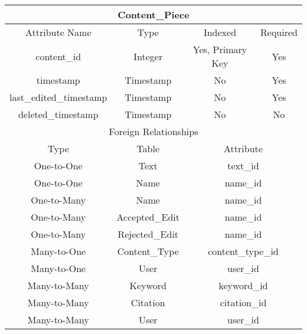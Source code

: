 \documentclass[12pt,letterpaper]{article}
\begin{document}
\begin{center}
\label{ContentPiece}
\begin{tabular}{|c|c|c|c|}
\hline
\multicolumn{4}{|c|}{Content\_Piece} \\ \hline
\multicolumn{1}{|c|}{Attribute Name} & \multicolumn{1}{c|}{Type} & \multicolumn{1}{c|}{Indexed} & \multicolumn{1}{c|}{Required} \\ \hline
content\_id & Integer & Yes, Primary Key & Yes \\ \hline
timestamp & Timestamp & No & Yes \\ \hline
last\_edited\_timestamp & Timestamp & No & Yes \\ \hline
deleted\_timestamp & Timestamp & No & No \\ \hline
\multicolumn{4}{|c|}{Foreign Relationships} \\ \hline
Type & Table & \multicolumn{2}{c|}{Attribute} \\ \hline
One-to-One & Text & \multicolumn{2}{c|}{text\_id} \\ \hline %
One-to-One & Name & \multicolumn{2}{c|}{name\_id} \\ \hline	%
One-to-Many & Name & \multicolumn{2}{c|}{name\_id} \\ \hline %
One-to-Many & Accepted\_Edit & \multicolumn{2}{c|}{name\_id} \\ \hline %
One-to-Many & Rejected\_Edit & \multicolumn{2}{c|}{name\_id} \\ \hline %
Many-to-One & Content\_Type & \multicolumn{2}{c|}{content\_type\_id} \\ \hline %
Many-to-One & User & \multicolumn{2}{c|}{user\_id} \\ \hline %
Many-to-Many & Keyword & \multicolumn{2}{c|}{keyword\_id} \\ \hline	%
Many-to-Many & Citation & \multicolumn{2}{c|}{citation\_id} \\ \hline %
Many-to-Many & User & \multicolumn{2}{c|}{user\_id} \\ \hline %
\end{tabular}
\end{center}
\end{document}
